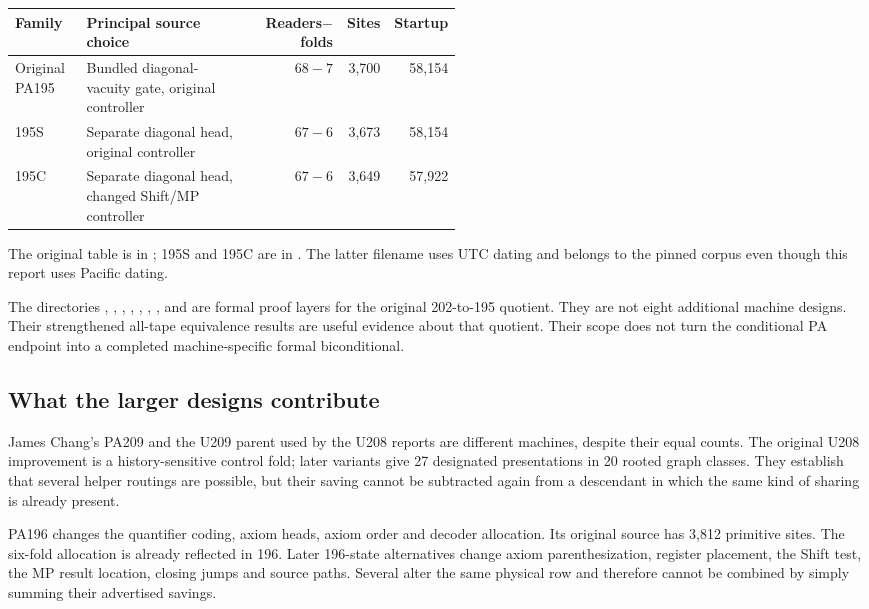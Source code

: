 \begin{center}\small
\begin{tabular}{@{}p{0.16\linewidth}p{0.36\linewidth}rrr@{}}
\toprule
Family & Principal source choice & Readers$-$folds & Sites & Startup\\
\midrule
Original PA195 & Bundled diagonal-vacuity gate, original controller
 & $68-7$ &3,700&58,154\\
195S & Separate diagonal head, original controller
 & $67-6$ &3,673&58,154\\
195C & Separate diagonal head, changed Shift/MP controller
 & $67-6$ &3,649&57,922\\
\bottomrule
\end{tabular}
\end{center}
The original table is in ; 195S and 195C
are in . The latter filename uses
UTC dating and belongs to the pinned corpus even though this report uses
Pacific dating.

The directories , ,
, , ,
, , and 
are formal proof layers for the original 202-to-195 quotient. They are not
eight additional machine designs. Their strengthened all-tape equivalence
results are useful evidence about that quotient. Their scope does not turn
the conditional PA endpoint into a completed machine-specific formal
biconditional.

\subsection{What the larger designs contribute}

James Chang's PA209 and the U209 parent used by the U208 reports are different
machines, despite their equal counts. The original U208 improvement is a
history-sensitive control fold; later variants give 27 designated
presentations in 20 rooted graph classes. They establish that several
helper routings are possible, but their saving cannot be subtracted again
from a descendant in which the same kind of sharing is already present.

PA196 changes the quantifier coding, axiom heads, axiom order and decoder
allocation. Its original source has 3,812 primitive sites. The six-fold
allocation is already reflected in 196. Later 196-state alternatives change
axiom parenthesization, register placement, the Shift test, the MP result
location, closing jumps and source paths. Several alter the same physical
row and therefore cannot be combined by simply summing their advertised
savings.

